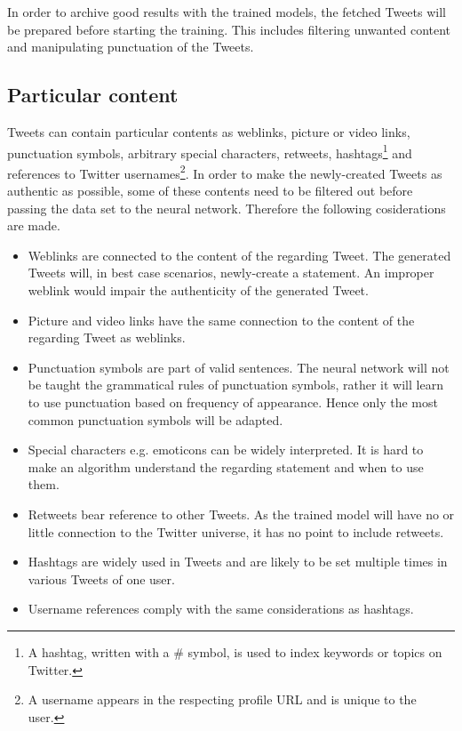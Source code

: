 \documentclass[conference]{IEEEtran}
\begin{document}
In order to archive good results with the trained models, the fetched Tweets will be prepared before starting the training. This includes filtering unwanted content and manipulating punctuation of the Tweets. 

\subsection{Particular content}\label{subsec_particular_content}

Tweets can contain particular contents as weblinks, picture or video links, punctuation symbols, arbitrary special characters, retweets, hashtags\footnote{A hashtag, written with a \# symbol, is used to index keywords or topics on Twitter.} and references to Twitter usernames\footnote{A username appears in the respecting profile URL and is unique to the user.}. In order to make the newly-created Tweets as authentic as possible, some of these contents need to be filtered out before passing the data set to the neural network. Therefore the following cosiderations are made.\\

\begin{itemize}
\item Weblinks are connected to the content of the regarding Tweet. The generated Tweets will, in best case scenarios, newly-create a statement. An improper weblink would impair the authenticity of the generated Tweet.
\item Picture and video links have the same connection to the content of the regarding Tweet as weblinks.
\item Punctuation symbols are part of valid sentences. The neural network will not be taught the grammatical rules of punctuation symbols, rather it will learn to use punctuation based on frequency of appearance. Hence only the most common punctuation symbols will be adapted.
\item Special characters e.g. emoticons can be widely interpreted. It is hard to make an algorithm understand the regarding statement and when to use them. 
\item Retweets bear reference to other Tweets. As the trained model will have no or little connection to the Twitter universe, it has no point to include retweets.
\item Hashtags are widely used in Tweets and are likely to be set multiple times in various Tweets of one user.
\item Username references comply with the same considerations as hashtags.
\end{itemize}
\end{document}
